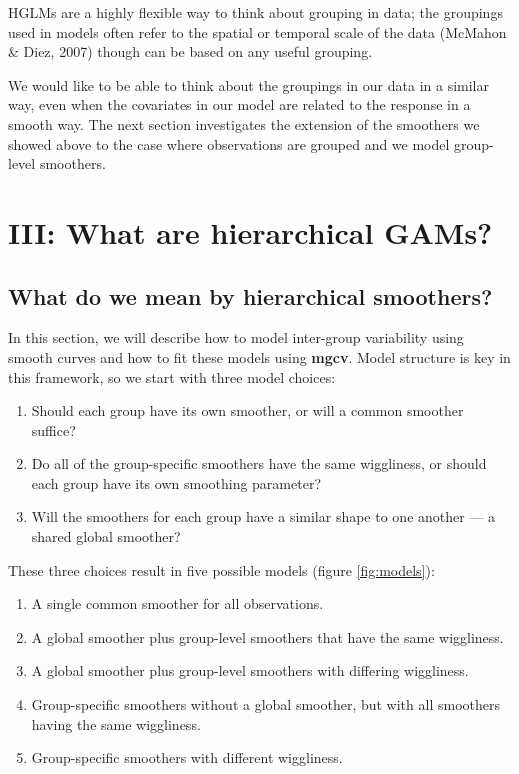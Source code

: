 \documentclass[12pt]{article}
\providecommand{\tightlist}{%
  \setlength{\itemsep}{0pt}\setlength{\parskip}{0pt}}
\begin{document}
HGLMs are a highly flexible way to think about grouping in data; the
groupings used in models often refer to the spatial or temporal scale of
the data (McMahon \& Diez, 2007) though can be based on any useful
grouping.

We would like to be able to think about the groupings in our data in a
similar way, even when the covariates in our model are related to the
response in a smooth way. The next section investigates the extension of
the smoothers we showed above to the case where observations are grouped
and we model group-level smoothers. \FloatBarrier

\section{III: What are hierarchical
GAMs?}\label{iii-what-are-hierarchical-gams}

\subsection{What do we mean by hierarchical
smoothers?}\label{what-do-we-mean-by-hierarchical-smoothers}

In this section, we will describe how to model inter-group variability
using smooth curves and how to fit these models using \textbf{mgcv}.
Model structure is key in this framework, so we start with three model
choices:

\begin{enumerate}
\def\labelenumi{\arabic{enumi}.}
\tightlist
\item
  Should each group have its own smoother, or will a common smoother
  suffice?
\item
  Do all of the group-specific smoothers have the same wiggliness, or
  should each group have its own smoothing parameter?
\item
  Will the smoothers for each group have a similar shape to one another
  --- a shared global smoother?
\end{enumerate}

These three choices result in five possible models (figure
\ref{fig:models}):

\begin{enumerate}
\def\labelenumi{\arabic{enumi}.}
\tightlist
\item
  A single common smoother for all observations.
\item
  A global smoother plus group-level smoothers that have the same
  wiggliness.
\item
  A global smoother plus group-level smoothers with differing
  wiggliness.
\item
  Group-specific smoothers without a global smoother, but with all
  smoothers having the same wiggliness.
\item
  Group-specific smoothers with different wiggliness.
\end{enumerate}
\end{document}
